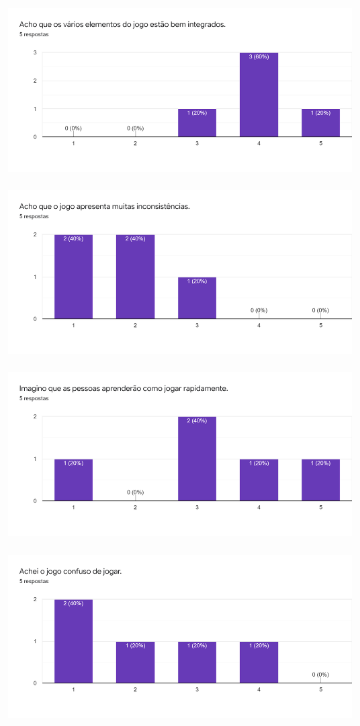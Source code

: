 \documentclass[
	12pt,				%
	openright,			%
	twoside,			%
	a4paper,			%
	english,			%
	french,				%
	spanish,			%
	brazil				%
	]{abntex2}
\begin{document}
\begin{figure}[h!]
\begin{subfigure}[b]{0.49\linewidth}
  \end{subfigure}
  \begin{subfigure}[b]{0.49\linewidth}
    \includegraphics[width=\linewidth]{forms5.png}
  \end{subfigure}
  \begin{subfigure}[b]{0.49\linewidth}
    \includegraphics[width=\linewidth]{forms6.png}
  \end{subfigure}
  \begin{subfigure}[b]{0.49\linewidth}
    \includegraphics[width=\linewidth]{forms7.png}
  \end{subfigure}
  \begin{subfigure}[b]{0.49\linewidth}
    \includegraphics[width=\linewidth]{forms8.png}

\end{subfigure}
\end{figure}
\end{document}
